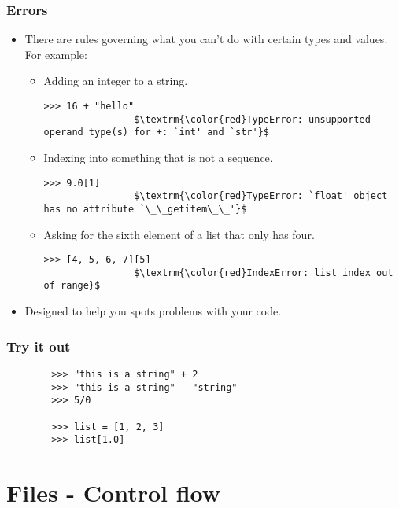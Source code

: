 \documentclass[presentation]{beamer}
\begin{document}
	\begin{frame}[fragile]
		\frametitle{Errors}
		
		\begin{itemize}
			\item There are rules governing what you can't do with certain types and values.
			\pause For example:
			\begin{itemize}
				\item Adding an integer to a string.
				\begin{lstlisting}[xleftmargin=\dimexpr-\leftmargini]
				>>> 16 + "hello"
				$\textrm{\color{red}TypeError: unsupported operand type(s) for +: `int' and `str'}$
				\end{lstlisting}
				
				\pause
				
				\item Indexing into something that is not a sequence.
				\begin{lstlisting}[xleftmargin=\dimexpr-\leftmargini]
				>>> 9.0[1]
				$\textrm{\color{red}TypeError: `float' object has no attribute `\_\_getitem\_\_'}$
				\end{lstlisting}
				
				\pause
				
				\item Asking for the sixth element of a list that only has four.
				\begin{lstlisting}[xleftmargin=\dimexpr-\leftmargini]
				>>> [4, 5, 6, 7][5]
				$\textrm{\color{red}IndexError: list index out of range}$
				\end{lstlisting}
				
				\pause
			\end{itemize}
			\item Designed to help you spots problems with your code.
		\end{itemize}
	\end{frame}
	
	\begin{frame}[fragile]
		\frametitle{Try it out}
		
		\begin{lstlisting}
		>>> "this is a string" + 2
		>>> "this is a string" - "string"
		>>> 5/0
		
		>>> list = [1, 2, 3]
		>>> list[1.0]
		\end{lstlisting}
	\end{frame}
	
	\section{Files - Control flow}
	
\end{document}
